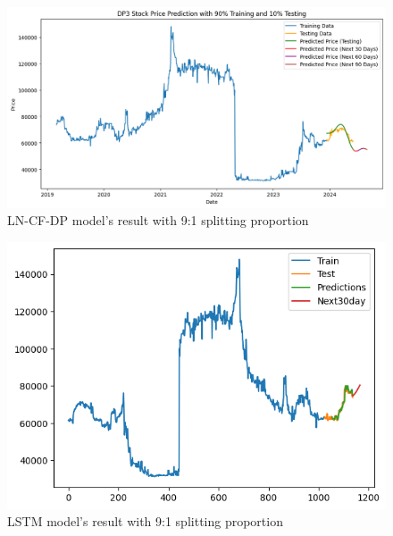 \documentclass{ieeeojies}
\begin{document}
\begin{figure}[H]
  \centering
  \begin{minipage}{0.8\linewidth}
    \centering
    \includegraphics[width=\linewidth]{bibliography/Figure/DP3_LN_CF&DP.png}
    \caption{LN-CF-DP model's result with 9:1 splitting proportion}
    \label{fig8}
  \end{minipage}
\end{figure}

\begin{figure}[H]
  \centering
  \begin{minipage}{0.8\linewidth}
    \centering
    \includegraphics[width=\linewidth]{bibliography/Figure/LSTM_DP3(9_1).png}
    \caption{LSTM model's result with 9:1 splitting proportion}
    \label{fig8}
  \end{minipage}
\end{figure}
\end{document}
